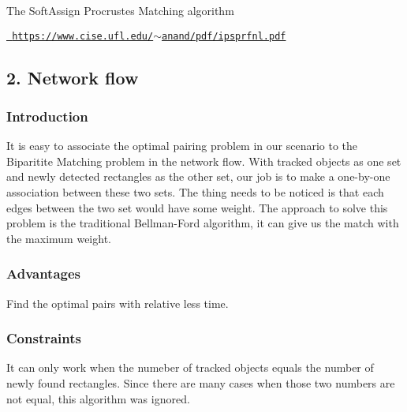 The Soft\+Assign Procrustes Matching algorithm

\href{https://www.cise.ufl.edu/~anand/pdf/ipsprfnl.pdf}{\texttt{ https\+://www.\+cise.\+ufl.\+edu/$\sim$anand/pdf/ipsprfnl.\+pdf}}

\subsection*{2. Network flow}

\subsubsection*{Introduction}

It is easy to associate the optimal pairing problem in our scenario to the Biparitite Matching problem in the network flow. With tracked objects as one set and newly detected rectangles as the other set, our job is to make a one-\/by-\/one association between these two sets. The thing needs to be noticed is that each edges between the two set would have some weight. The approach to solve this problem is the traditional Bellman-\/\+Ford algorithm, it can give us the match with the maximum weight.

\subsubsection*{Advantages}

Find the optimal pairs with relative less time.

\subsubsection*{Constraints}

It can only work when the numeber of tracked objects equals the number of newly found rectangles. Since there are many cases when those two numbers are not equal, this algorithm was ignored. 